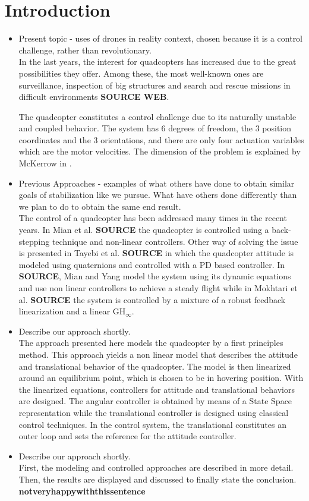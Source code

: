 \section{Introduction}
\begin{itemize}
\item Present topic - uses of drones in reality context, chosen because it is a control challenge, rather than revolutionary.\\
In the last years, the interest for quadcopters has increased due to the great possibilities they offer. Among these, the most well-known ones are surveillance, inspection of big structures and search and rescue missions in difficult environments \textbf{SOURCE WEB}.

The quadcopter constitutes a control challenge due to its naturally unstable and coupled behavior. The system has 6 degrees of freedom, the 3 position coordinates and the 3 orientations, and there are only four actuation variables which are the motor velocities. The dimension of the problem is explained by McKerrow in \cite{YDing}.

\item Previous Approaches - examples of what others have done to obtain similar goals of stabilization like we pursue. What have others done differently than we plan to do to obtain the same end result. \\ 
The control of a quadcopter has been addressed many times in the recent years. In Mian et al. \textbf{SOURCE} the quadcopter is controlled using a back-stepping technique and non-linear controllers. Other way of solving the issue is presented in Tayebi et al. \textbf{SOURCE} in which the quadcopter attitude is modeled using quaternions and controlled with a PD based controller. In \textbf{SOURCE}, Mian and Yang model the system using its dynamic equations and use non linear controllers to achieve a steady flight while in Mokhtari et al. \textbf{SOURCE} the system is controlled by a mixture of a robust feedback linearization and a linear GH$_{\infty}$.

\item Describe our approach shortly.\\
The approach presented here models the quadcopter by a first principles method. This approach yields a non linear model that describes the attitude and translational behavior of the quadcopter. The model is then linearized around an equilibrium point, which is chosen to be in hovering position. With the linearized equations, controllers for attitude and translational behaviors are designed. The angular controller is obtained by means of a State Space representation while the translational controller is designed using classical control techniques. In the control system, the translational constitutes an outer loop  and sets the reference for the attitude controller.
\item Describe our approach shortly.\\
First, the modeling and controlled approaches are described in more detail. Then, the results are displayed and discussed to finally state the conclusion. \textbf{notveryhappywiththissentence}
\end{itemize}


